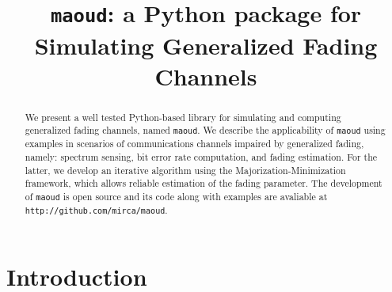 \documentclass[conference, 10pt]{IEEEtran}
\begin{document}
\title{\texttt{maoud}: a Python package for Simulating Generalized Fading Channels}

\author{
}

\maketitle

\begin{abstract}
    We present a well tested Python-based library for simulating and computing
    generalized fading channels, named \texttt{maoud}. We describe the
    applicability of \texttt{maoud} using examples in scenarios of communications
    channels impaired by generalized fading, namely: spectrum sensing, bit error
    rate computation, and fading estimation. For the latter, we develop an iterative
    algorithm using the Majorization-Minimization framework, which allows reliable
    estimation of the fading parameter. The development of \texttt{maoud} is open
    source and its code along with examples are avaliable at
    \texttt{http://github.com/mirca/maoud}.
\end{abstract}

\IEEEpeerreviewmaketitle
\section{Introduction}
\end{document}
